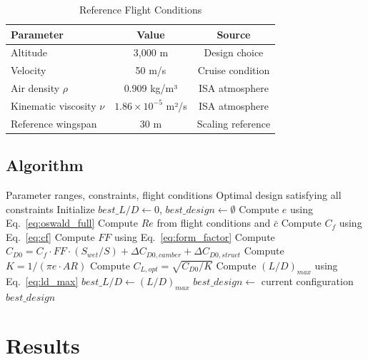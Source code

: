 \documentclass[11pt,a4paper]{article}
\begin{document}
\begin{table}[h]
\centering
\caption{Reference Flight Conditions}
\label{tab:flight_cond}
\begin{tabular}{lcc}
\hline\hline
Parameter & Value & Source \\
\hline
Altitude & 3,000 m & Design choice \\
Velocity & 50 m/s & Cruise condition \\
Air density $\rho$ & 0.909 kg/m³ & ISA atmosphere \\
Kinematic viscosity $\nu$ & $1.86 \times 10^{-5}$ m²/s & ISA atmosphere \\
Reference wingspan & 30 m & Scaling reference \\
\hline\hline
\end{tabular}
\end{table}

\subsection{Algorithm}

\begin{algorithm}
\caption{Exhaustive Aerodynamic Optimization}
\label{alg:optimization}
\begin{algorithmic}[1]
\REQUIRE Parameter ranges, constraints, flight conditions
\ENSURE Optimal design satisfying all constraints
\STATE Initialize $best\_L/D \leftarrow 0$, $best\_design \leftarrow \emptyset$
    \STATE Compute $e$ using Eq.~\eqref{eq:oswald_full}
    \STATE Compute $Re$ from flight conditions and $\bar{c}$
    \STATE Compute $C_f$ using Eq.~\eqref{eq:cf}
    \STATE Compute $FF$ using Eq.~\eqref{eq:form_factor}
    \STATE Compute $C_{D0} = C_f \cdot FF \cdot (S_{wet}/S) + \Delta C_{D0,camber} + \Delta C_{D0,struct}$
    \STATE Compute $K = 1/(\pi e \cdot AR)$
    \STATE Compute $C_{L,opt} = \sqrt{C_{D0}/K}$
    \STATE Compute $(L/D)_{max}$ using Eq.~\eqref{eq:ld_max}
        \STATE $best\_L/D \leftarrow (L/D)_{max}$
        \STATE $best\_design \leftarrow$ current configuration
    \ENDIF
\ENDFOR
\RETURN $best\_design$
\end{algorithmic}
\end{algorithm}

\section{Results}
\end{document}
